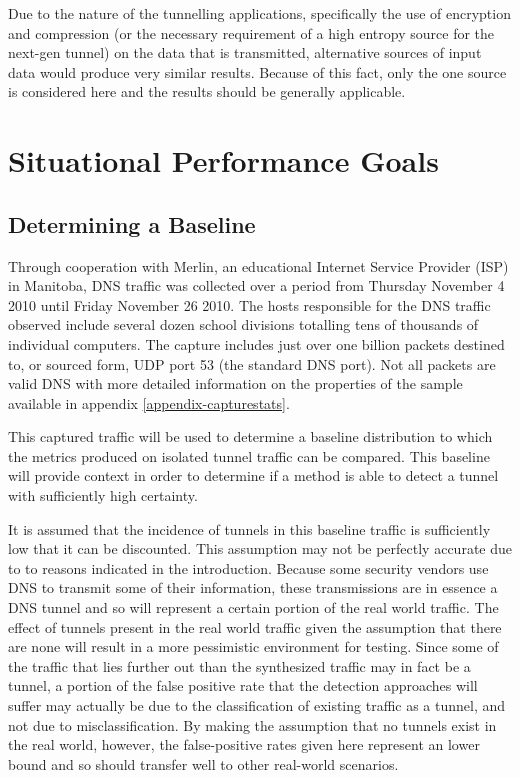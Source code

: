 \documentclass[12pt]{report}
\theoremstyle{remark}
\theoremstyle{definition}
\theoremstyle{definition}
\theoremstyle{definition}
\begin{document}
Due to the nature of the tunnelling applications, specifically the use of
encryption and compression (or the necessary requirement of a high entropy
source for the next-gen tunnel) on the data that is transmitted, alternative
sources of input data would produce very similar results. Because of this fact,
only the one source is considered here and the results should be generally
applicable.


\section{Situational Performance Goals}
\subsection{Determining a Baseline}
\label{baseline}
Through cooperation with Merlin, an educational Internet Service Provider (ISP)
in Manitoba, DNS traffic was collected over a period from Thursday November 4
2010 until Friday November 26 2010. The hosts responsible for the DNS traffic
observed include several dozen school divisions totalling tens of thousands of
individual computers. The capture includes just over one billion packets
destined to, or sourced form, UDP port 53 (the standard DNS port). Not all
packets are valid DNS with more detailed information on the properties of the
sample available in appendix \ref{appendix-capturestats}.

This captured traffic will be used to determine a baseline distribution to which
the metrics produced on isolated tunnel traffic can be compared. This baseline
will provide context in order to determine if a method is able to detect a
tunnel with sufficiently high certainty.

It is assumed that the incidence of tunnels in this baseline traffic is
sufficiently low that it can be discounted. This assumption may not be perfectly
accurate due to to reasons indicated in the introduction. Because some security
vendors use DNS to transmit some of their information, these transmissions are
in essence a DNS tunnel and so will represent a certain portion of the real
world traffic. The effect of tunnels present in the real world traffic given the
assumption that there are none will result in a more pessimistic environment for
testing. Since some of the traffic that lies further out than the synthesized
traffic may in fact be a tunnel, a portion of the false positive rate that the
detection approaches will suffer may actually be due to the classification of
existing traffic as a tunnel, and not due to misclassification. By making the
assumption that no tunnels exist in the real world, however, the false-positive
rates given here represent an lower bound and so should transfer well to other
real-world scenarios.
\end{document}
